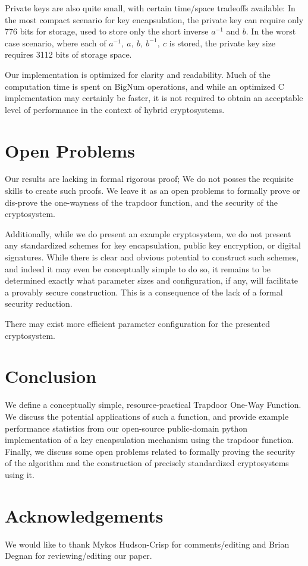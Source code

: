 \documentclass[preprint]{iacrtrans}
\begin{document}
Private keys are also quite small, with certain time/space tradeoffs available: In the most compact scenario for key encapsulation, the private key can require only 776 bits for storage, used to store only the short inverse $a^{-1}$ and $b$. In the worst case scenario, where each of $a^{-1},\ a,\ b,\ b^{-1},\ c$ is stored, the private key size requires 3112 bits of storage space. 

Our implementation is optimized for clarity and readability. Much of the computation time is spent on BigNum operations, and while an optimized C implementation may certainly be faster, it is not required to obtain an acceptable level of performance in the context of hybrid cryptosystems. 

\section{Open Problems}
Our results are lacking in formal rigorous proof; We do not posses the requisite skills to create such proofs. We leave it as an open problems to formally prove or dis-prove the one-wayness of the trapdoor function, and the security of the cryptosystem.

Additionally, while we do present an example cryptosystem, we do not present any standardized schemes for key encapsulation, public key encryption, or digital signatures. While there is clear and obvious potential to construct such schemes, and indeed it may even be conceptually simple to do so, it remains to be determined exactly what parameter sizes and configuration, if any, will facilitate a provably secure construction. This is a consequence of the lack of a formal security reduction. 

There may exist more efficient parameter configuration for the presented cryptosystem. 

\section{Conclusion}
We define a conceptually simple, resource-practical Trapdoor One-Way Function. We discuss the potential applications of such a function, and provide example performance statistics from our open-source public-domain python implementation of a key encapsulation mechanism using the trapdoor function. Finally, we discuss some open problems related to formally proving the security of the algorithm and the construction of precisely standardized cryptosystems using it.


\section*{Acknowledgements}

We would like to thank Mykos Hudson-Crisp for comments/editing and Brian Degnan for reviewing/editing our paper.
\end{document}
